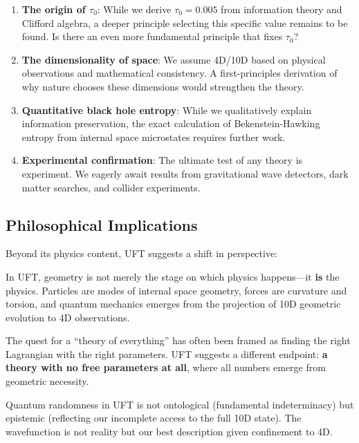 \begin{enumerate}
    \item \textbf{The origin of $\tau_0$}: While we derive $\tau_0 = 0.005$ from information theory and Clifford algebra, a deeper principle selecting this specific value remains to be found. Is there an even more fundamental principle that fixes $\tau_0$?
    
    \item \textbf{The dimensionality of space}: We assume 4D/10D based on physical observations and mathematical consistency. A first-principles derivation of why nature chooses these dimensions would strengthen the theory.
    
    \item \textbf{Quantitative black hole entropy}: While we qualitatively explain information preservation, the exact calculation of Bekenstein-Hawking entropy from internal space microstates requires further work.
    
    \item \textbf{Experimental confirmation}: The ultimate test of any theory is experiment. We eagerly await results from gravitational wave detectors, dark matter searches, and collider experiments.
\end{enumerate}

\subsection{Philosophical Implications}

Beyond its physics content, UFT suggests a shift in perspective:

\begin{insight}
In UFT, geometry is not merely the stage on which physics happens—it \textbf{is} the physics. Particles are modes of internal space geometry, forces are curvature and torsion, and quantum mechanics emerges from the projection of 10D geometric evolution to 4D observations.
\end{insight}

\begin{insight}
The quest for a ``theory of everything'' has often been framed as finding the right Lagrangian with the right parameters. UFT suggests a different endpoint: \textbf{a theory with no free parameters at all}, where all numbers emerge from geometric necessity.
\end{insight}

\begin{insight}
Quantum randomness in UFT is not ontological (fundamental indeterminacy) but epistemic (reflecting our incomplete access to the full 10D state). The wavefunction is not reality but our best description given confinement to 4D.
\end{insight}

